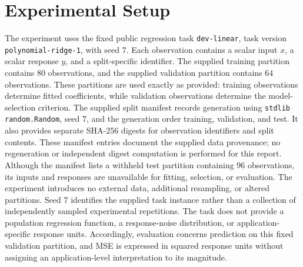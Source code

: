 \documentclass[11pt]{article}
\begin{document}
\section{Experimental Setup}
The experiment uses the fixed public regression task \texttt{dev-linear}, task version \texttt{polynomial-ridge-1}, with seed \(7\). Each observation contains a scalar input \(x\), a scalar response \(y\), and a split-specific identifier. The supplied training partition contains \(80\) observations, and the supplied validation partition contains \(64\) observations. These partitions are used exactly as provided: training observations determine fitted coefficients, while validation observations determine the model-selection criterion. The supplied split manifest records generation using \texttt{stdlib random.Random}, seed \(7\), and the generation order training, validation, and test. It also provides separate SHA-256 digests for observation identifiers and split contents. These manifest entries document the supplied data provenance; no regeneration or independent digest computation is performed for this report. Although the manifest lists a withheld test partition containing \(96\) observations, its inputs and responses are unavailable for fitting, selection, or evaluation. The experiment introduces no external data, additional resampling, or altered partitions. Seed \(7\) identifies the supplied task instance rather than a collection of independently sampled experimental repetitions. The task does not provide a population regression function, a response-noise distribution, or application-specific response units. Accordingly, evaluation concerns prediction on this fixed validation partition, and MSE is expressed in squared response units without assigning an application-level interpretation to its magnitude.
\end{document}
